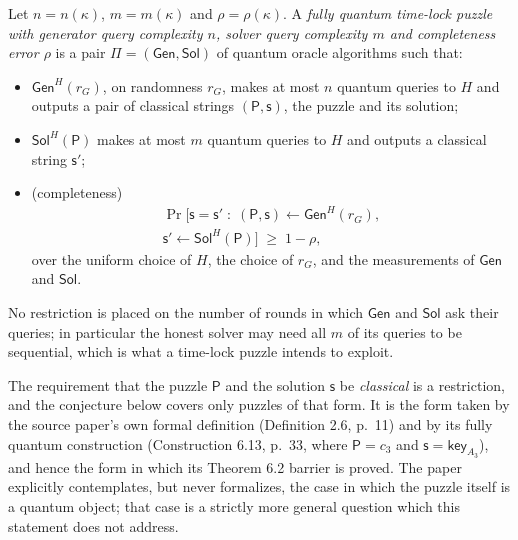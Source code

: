 \documentclass{aicr-conjecture}
\newcommand{\Gen}{\mathsf{Gen}}
\newcommand{\Sol}{\mathsf{Sol}}
\newcommand{\puz}{\mathsf{P}}
\newcommand{\solu}{\mathsf{s}}
\newcommand{\solhon}{\mathsf{s}'}
\begin{document}
\begin{definition}\label{def:qgqs-tlp}
Let $n = n(\kappa)$, $m = m(\kappa)$ and $\rho = \rho(\kappa)$. A
\emph{fully quantum time-lock puzzle with generator query complexity $n$,
solver query complexity $m$ and completeness error $\rho$} is a pair
$\Pi = (\Gen, \Sol)$ of quantum oracle algorithms such that:
\begin{itemize}
  \item $\Gen^{H}(r_G)$, on randomness $r_G$, makes at most $n$ quantum
    queries to $H$ and outputs a pair of classical strings
    $(\puz, \solu)$, the puzzle and its solution;
  \item $\Sol^{H}(\puz)$ makes at most $m$ quantum queries to $H$ and
    outputs a classical string $\solhon$;
  \item (completeness)
    \begin{multline*}
      \Pr\bigl[\solu = \solhon \;:\;
        (\puz, \solu) \leftarrow \Gen^{H}(r_G), \\
        \solhon \leftarrow \Sol^{H}(\puz)\bigr] \;\ge\; 1 - \rho,
    \end{multline*}
    over the uniform choice of $H$, the choice of $r_G$, and the
    measurements of $\Gen$ and $\Sol$.
\end{itemize}
No restriction is placed on the number of rounds in which $\Gen$ and $\Sol$
ask their queries; in particular the honest solver may need all $m$ of its
queries to be sequential, which is what a time-lock puzzle intends to
exploit.

The requirement that the puzzle $\puz$ and the solution $\solu$ be
\emph{classical} is a restriction, and the conjecture below covers only
puzzles of that form. It is the form taken by the source paper's own formal
definition (Definition 2.6, p.~11) and by its fully quantum construction
(Construction 6.13, p.~33, where $\puz = c_3$ and
$\solu = \mathsf{key}_{A_3}$), and hence the form in which its Theorem 6.2
barrier is proved. The paper explicitly contemplates, but never formalizes,
the case in which the puzzle itself is a quantum object; that case is a
strictly more general question which this statement does not address.
\end{definition}
\end{document}
